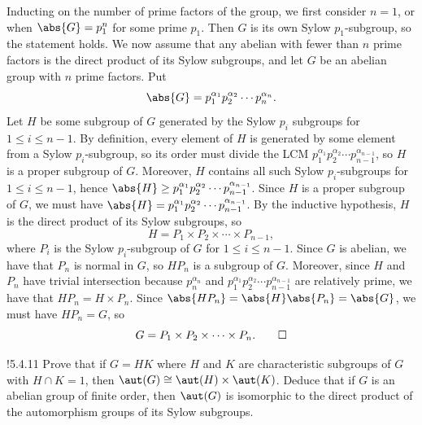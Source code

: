 \begin{sol}
    Inducting on the number of prime factors of the group, we first consider $n = 1$, or when $\abs{G} = p_1^n$ for some prime $p_1$.
	Then $G$ is its own Sylow $p_1$-subgroup, so the statement holds.
	We now assume that any abelian with fewer than $n$ prime factors is the direct product of its Sylow subgroups, and let $G$ be an abelian group with $n$ prime factors.
	Put
    \[
    	\abs{G} = p_1^{\alpha_1} p_2^{\alpha_2} \cdots p_n^{\alpha_n}.
    \]
    Let $H$ be some subgroup of $G$ generated by the Sylow $p_i$ subgroups for $1 \leq i \leq n - 1$.
	By definition, every element of $H$ is generated by some element from a Sylow $p_i$-subgroup, so its order must divide the LCM $p_1^{\alpha_1} p_2^{\alpha_2} \cdots p_{n-1}^{\alpha_{n-1}}$, so $H$ is a proper subgroup of $G$.
	Moreover, $H$ contains all such Sylow $p_i$-subgroups for $1 \leq i \leq n - 1$, hence $\abs{H} \geq p_1^{\alpha_1} p_2^{\alpha_2} \cdots p_{n-1}^{\alpha_{n-1}}$.
	Since $H$ is a proper subgroup of $G$, we must have $\abs{H} = p_1^{\alpha_1} p_2^{\alpha_2} \cdots p_{n-1}^{\alpha_{n-1}}$.
	By the inductive hypothesis, $H$ is the direct product of its Sylow subgroups, so
    \[
    	H = P_1 \times P_2 \times \cdots \times P_{n-1},
    \]
    where $P_i$ is the Sylow $p_i$-subgroup of $G$ for $1 \leq i \leq n - 1$.
	Since $G$ is abelian, we have that $P_n$ is normal in $G$, so $HP_n$ is a subgroup of $G$.
	Moreover, since $H$ and $P_n$ have trivial intersection because $p_n^{\alpha_n}$ and $p_1^{\alpha_1} p_2^{\alpha_2} \cdots p_{n-1}^{\alpha_{n-1}}$ are relatively prime, we have that $HP_n = H \times P_n$.
	Since $\abs{HP_n} = \abs{H}\abs{P_n} = \abs{G}$, we must have $HP_n = G$, so
    \[
    	G = P_1 \times P_2 \times \cdots \times P_n. \qedhere
    \]
\end{sol}

\begin{exercise}!{5.4.11}
    Prove that if $G = HK$ where $H$ and $K$ are characteristic subgroups of $G$ with $H \cap K = 1$, then $\aut(G) \cong \aut(H) \times \aut(K)$.
	Deduce that if $G$ is an abelian group of finite order, then $\aut(G)$ is isomorphic to the direct product of the automorphism groups of its Sylow subgroups.
\end{exercise}


